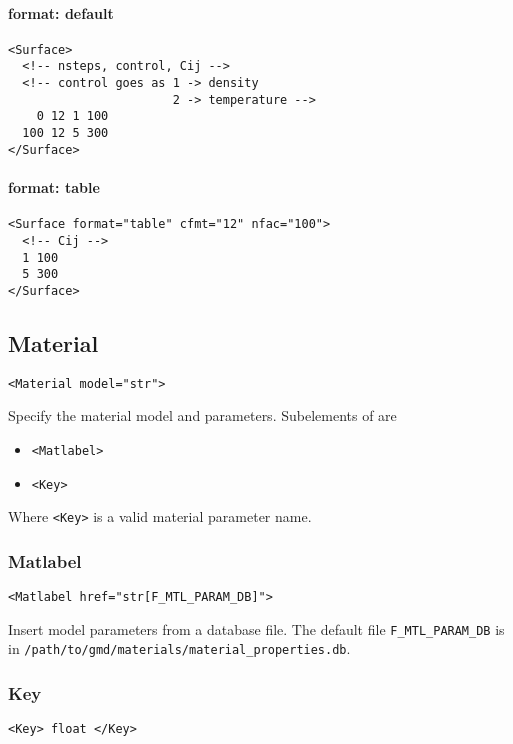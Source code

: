 \documentclass[11pt]{report}
\renewcommand{\tag}[1]{\texttt{<#1>}}
\newcommand{\reqdtag}[1]{\Red{\texttt{<#1>}}}
\begin{document}
\paragraph{format: default}
\begin{verbatim}
<Surface>
  <!-- nsteps, control, Cij -->
  <!-- control goes as 1 -> density
                       2 -> temperature -->
    0 12 1 100
  100 12 5 300
</Surface>
\end{verbatim}

\paragraph{format: table}
\begin{verbatim}
<Surface format="table" cfmt="12" nfac="100">
  <!-- Cij -->
  1 100
  5 300
</Surface>
\end{verbatim}

\subsection{Material}
\begin{verbatim}
<Material model="str">
\end{verbatim}
%
Specify the material model and parameters. Subelements of \reqdtag{Material}
are
%
\begin{itemize}
  \item \tag{Matlabel}
  \item \tag{Key}
\end{itemize}
%
Where \tag{Key} is a valid material parameter name.

\subsubsection{Matlabel}
\begin{verbatim}
<Matlabel href="str[F_MTL_PARAM_DB]">
\end{verbatim}
%
Insert model parameters from a database file.  The default file
\verb|F_MTL_PARAM_DB| is in \verb|/path/to/gmd/materials/material_properties.db|.

\subsubsection{Key}
\begin{verbatim}
<Key> float </Key>
\end{verbatim}
\end{document}
